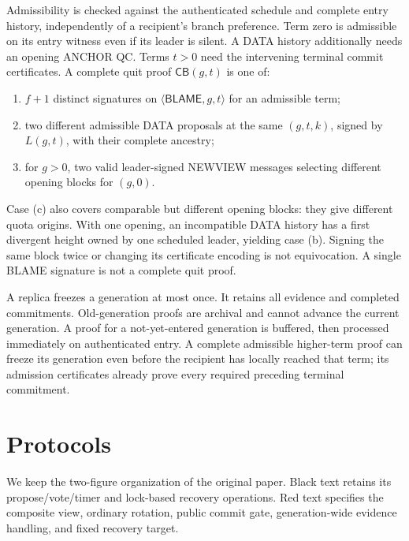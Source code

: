 \documentclass[11pt,a4paper]{article}
\newcommand{\CB}{\mathsf{CB}}
\newcommand{\tagg}[1]{\mathsf{#1}}
\newcounter{protocol}
\begin{document}
Admissibility is checked against the authenticated schedule and complete
entry history, independently of a recipient's branch preference. Term zero
is admissible on its entry witness even if its leader is silent. A DATA
history additionally needs an opening ANCHOR QC. Terms $t>0$ need the
intervening terminal commit certificates. A complete quit proof
$\CB(g,t)$ is one of:
\begin{enumerate}[label=(\alph*)]
\item $f+1$ distinct signatures on $\langle\tagg{BLAME},g,t\rangle$
for an admissible term;
\item two different admissible DATA proposals at the same $(g,t,k)$,
signed by $L(g,t)$, with their complete ancestry;
\item for $g>0$, two valid leader-signed NEWVIEW messages selecting
different opening blocks for $(g,0)$.
\end{enumerate}
Case (c) also covers comparable but different opening blocks: they give
different quota origins. With one opening, an incompatible DATA history has
a first divergent height owned by one scheduled leader, yielding case (b).
Signing the same block twice or changing its certificate encoding is not
equivocation. A single BLAME signature is not a complete quit proof.

A replica freezes a generation at most once. It retains all evidence and
completed commitments. Old-generation proofs are archival and cannot
advance the current generation. A proof for a not-yet-entered generation
is buffered, then processed immediately on authenticated entry. A complete
admissible higher-term proof can freeze its generation even before the
recipient has locally reached that term; its admission certificates already
prove every required preceding terminal commitment.

\section{Protocols}
\label{sec:protocol}
We keep the two-figure organization of the original paper. Black text
retains its propose/vote/timer and lock-based recovery operations. Red text
specifies the composite view, ordinary rotation, public commit gate,
generation-wide evidence handling, and fixed recovery target.
\end{document}
